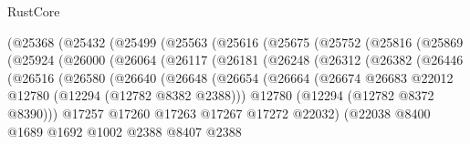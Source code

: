 \begin{lexlean}{RustCore}
\begin{coremodule}
                (@25368
                  (@25432
                    (@25499
                      (@25563
                        (@25616
                          (@25675
                            (@25752
                              (@25816
                                (@25869
                                  (@25924
                                    (@26000
                                      (@26064
                                        (@26117
                                          (@26181
                                            (@26248
                                              (@26312
                                                (@26382
                                                  (@26446
                                                    (@26516
                                                      (@26580
                                                        (@26640
                                                          (@26648
                                                            (@26654
                                                              (@26664
                                                                (@26674
                                                                  @26683
                                                                  @22012
                                                                  @12780
                                                                  (@12294 (@12782 @8382 @2388)))
                                                                @12780
                                                                (@12294 (@12782 @8372 @8390)))
                                                              @17257
                                                              @17260
                                                              @17263
                                                              @17267
                                                              @17272
                                                              @22032)
                                                            (@22038
                                                              @8400
                                                              @1689
                                                              @1692
                                                              @1002
                                                              @2388
                                                              @8407
                                                              @2388

\end{coremodule}
\end{lexlean}
